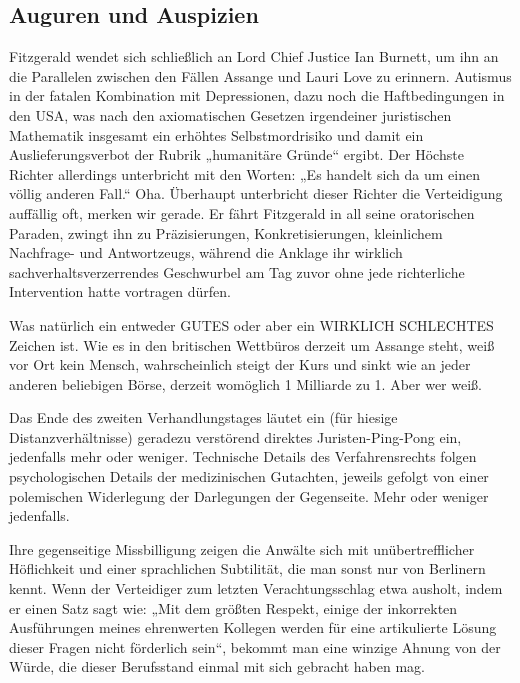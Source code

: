 \begin{multicols}{2}
\chapter{Auguren und Auspizien}
Fitzgerald wendet sich schließlich an Lord Chief Justice
Ian Burnett, um ihn an die Parallelen zwischen den Fällen Assange und Lauri Love zu erinnern. Autismus in der
fatalen Kombination mit Depressionen, dazu noch die
Haftbedingungen in den USA, was nach den axiomatischen Gesetzen irgendeiner juristischen Mathematik
insgesamt ein erhöhtes Selbstmordrisiko und damit ein
Auslieferungsverbot der Rubrik „humanitäre Gründe“
ergibt. Der Höchste Richter allerdings unterbricht mit
den Worten: „Es handelt sich da um einen völlig anderen
Fall.“ Oha. Überhaupt unterbricht dieser Richter die Verteidigung auffällig oft, merken wir gerade. Er fährt Fitzgerald in all seine oratorischen Paraden, zwingt ihn zu
Präzisierungen, Konkretisierungen, kleinlichem Nachfrage- und Antwortzeugs, während die Anklage ihr wirklich sachverhaltsverzerrendes Geschwurbel am Tag zuvor ohne jede richterliche Intervention hatte vortragen
dürfen.

Was natürlich ein entweder GUTES oder aber ein WIRKLICH SCHLECHTES Zeichen ist. Wie es in den britischen
Wettbüros derzeit um Assange steht, weiß vor Ort kein
Mensch, wahrscheinlich steigt der Kurs und sinkt wie
an jeder anderen beliebigen Börse, derzeit womöglich 1
Milliarde zu 1. Aber wer weiß.

Das Ende des zweiten Verhandlungstages läutet ein
(für hiesige Distanzverhältnisse) geradezu verstörend
direktes Juristen-Ping-Pong ein, jedenfalls mehr oder
weniger. Technische Details des Verfahrensrechts folgen
psychologischen Details der medizinischen Gutachten,
jeweils gefolgt von einer polemischen Widerlegung der
Darlegungen der Gegenseite. Mehr oder weniger jedenfalls.

Ihre gegenseitige Missbilligung zeigen die Anwälte sich
mit unübertrefflicher Höflichkeit und einer sprachlichen
Subtilität, die man sonst nur von Berlinern kennt. Wenn
der Verteidiger zum letzten Verachtungsschlag etwa ausholt, indem er einen Satz sagt wie: „Mit dem größten Respekt, einige der inkorrekten Ausführungen meines ehrenwerten Kollegen werden für eine artikulierte Lösung
dieser Fragen nicht förderlich sein“, bekommt man eine
winzige Ahnung von der Würde, die dieser Berufsstand
einmal mit sich gebracht haben mag.


\end{multicols}
